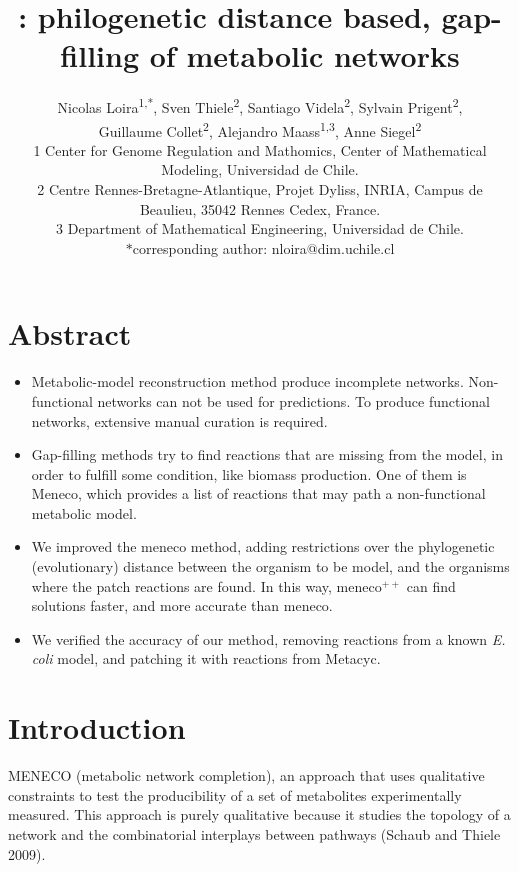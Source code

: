 \documentclass{article}
\title{\Meneco: philogenetic distance based, gap-filling of metabolic networks}
\author{Nicolas Loira\textsuperscript{1,*},
Sven Thiele\textsuperscript{2},
Santiago Videla\textsuperscript{2},
Sylvain Prigent\textsuperscript{2},\\
Guillaume Collet\textsuperscript{2},
Alejandro Maass\textsuperscript{1,3},
Anne Siegel\textsuperscript{2}\\
{\scriptsize 1 Center for Genome Regulation and Mathomics, Center of Mathematical Modeling, Universidad de Chile.}\\
{\scriptsize 2 Centre Rennes-Bretagne-Atlantique, Projet Dyliss, INRIA, Campus de Beaulieu, 35042 Rennes Cedex, France.}\\
{\scriptsize 3 Department of Mathematical Engineering, Universidad de Chile.} \\
{\scriptsize $*$corresponding author: nloira@dim.uchile.cl}
}
\newcommand{\meneco}{meneco$^{++}$\xspace}
\begin{document}
\maketitle

\section{Abstract}

\begin{itemize}
	\item Metabolic-model reconstruction method produce incomplete networks. Non-functional networks can not be used for predictions. To produce functional networks, extensive manual curation is required.
	\item Gap-filling methods try to find reactions that are missing from the model, in order to fulfill some condition, like biomass production. One of them is Meneco, which provides a list of reactions that may path a non-functional metabolic model.
	\item We improved the meneco method, adding restrictions over the phylogenetic (evolutionary) distance between the organism to be model, and the organisms where the patch reactions are found. In this way, \meneco can find solutions faster, and more accurate than meneco.
	\item We verified the accuracy of our method, removing reactions from a known \emph{E. coli} model, and patching it with reactions from Metacyc. 
\end{itemize}



\section{Introduction}

MENECO (metabolic network completion), an approach that uses qualitative constraints to test the producibility of a set of metabolites experimentally measured.
This approach is purely qualitative because it studies the topology of a network and the combinatorial interplays between pathways (Schaub and Thiele 2009).
\end{document}
